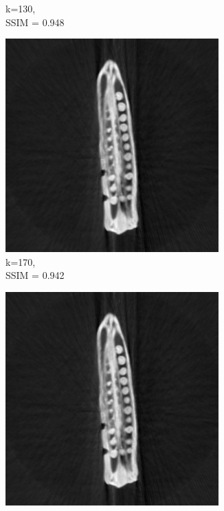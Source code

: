 \documentclass[journal]{IEEEtran}
\begin{document}
\begin{figure}[h]
\begin{subfigure}[b]{0.24\linewidth}
        \caption{k=130,\\ SSIM = 0.948}
     \end{subfigure}
  \begin{subfigure}[b]{0.24\linewidth}
        \includegraphics[width=\textwidth]{../images/okra/2D_okra/weighted_pca170.png}
        \caption{k=170,\\ SSIM = 0.942}
     \end{subfigure}
  \begin{subfigure}[b]{0.24\linewidth}
        \includegraphics[width=\textwidth]{../images/okra/2D_okra/weighted_pca210.png}

\end{subfigure}
\end{figure}
\end{document}
